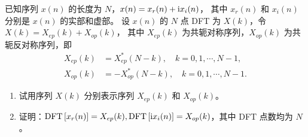 \begin{exercise}
    已知序列 $x(n)$ 的长度为 $N$，$x(n) = x_r(n) + \mathrm{i} x_i(n)$，
    其中 $x_r(n)$ 和 $x_i(n)$ 分别是 $x(n)$ 的实部和虚部。
    设 $x(n)$ 的 $N$ 点 DFT 为 $X(k)$，令 $X(k) = X_{ep}(k) + X_{op}(k)$，
    其中 $X_{ep}(k)$ 为共轭对称序列，$X_{op}(k)$ 为共轭反对称序列，即
    \begin{align*}
        X_{ep}(k) & = X_{ep}^*(N-k), \quad k = 0, 1, \cdots, N-1, \\
        X_{op}(k) & = -X_{op}^*(N-k), \quad k = 0, 1, \cdots, N-1.
    \end{align*}
    \begin{enumerate}[label=(\arabic*)]
        \item 试用序列 $X(k)$ 分别表示序列 $X_{ep}(k)$ 和 $X_{op}(k)$。
        \item 证明：$\mathrm{DFT}\left[x_r(n)\right] = X_{ep}(k), \mathrm{DFT}\left[\mathrm{i} x_i(n)\right] = X_{op}(k)$，其中 DFT 点数均为 $N$。
    \end{enumerate}
\end{exercise}


